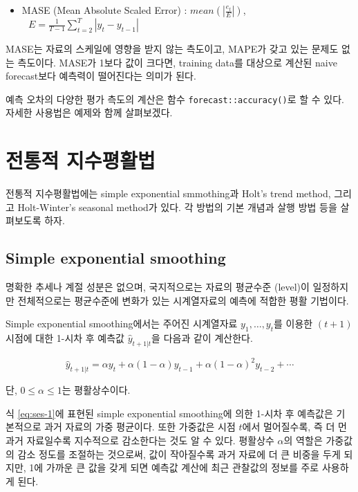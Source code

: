 \documentclass[
]{book}
\providecommand{\tightlist}{%
  \setlength{\itemsep}{0pt}\setlength{\parskip}{0pt}}
\begin{document}
\begin{itemize}
\tightlist
\item
  MASE (Mean Absolute Scaled Error) : \(mean(|\frac{e_{t}}{E}|)\), \(~~~E=\frac{1}{T-1}\sum_{t=2}^{T}|y_{t}-y_{t-1}|\)
\end{itemize}

MASE는 자료의 스케일에 영향을 받지 않는 측도이고, MAPE가 갖고 있는 문제도 없는 측도이다. MASE가 1보다 값이 크다면, training data를 대상으로 계산된 naive forecast보다 예측력이 떨어진다는 의미가 된다.

예측 오차의 다양한 평가 측도의 계산은 함수 \texttt{forecast::accuracy()}로 할 수 있다. 자세한 사용법은 예제와 함께 살펴보겠다.

\hypertarget{section-exponential}{%
\section{전통적 지수평활법}\label{section-exponential}}

전통적 지수평활법에는 simple exponential smmothing과 Holt's trend method, 그리고 Holt-Winter's seasonal method가 있다. 각 방법의 기본 개념과 살행 방법 등을 살펴보도록 하자.

\hypertarget{simple-exponential-smoothing}{%
\subsection{Simple exponential smoothing}\label{simple-exponential-smoothing}}

명확한 추세나 계절 성분은 없으며, 국지적으로는 자료의 평균수준 (level)이 일정하지만 전체적으로는 평균수준에 변화가 있는 시계열자료의 예측에 적합한 평활 기법이다.

Simple exponential smoothing에서는 주어진 시계열자료 \(y_{1}, \ldots, y_{t}\)를 이용한 \((t+1)\) 시점에 대한 1-시차 후 예측값 \(\hat{y}_{t+1|t}\)을 다음과 같이 계산한다.

\begin{equation}
\hat{y}_{t+1|t} = \alpha y_{t} + \alpha(1-\alpha) y_{t-1} + \alpha(1-\alpha)^{2} y_{t-2} + \cdots
\label{eq:ses-1}
\end{equation}

단, \(0 \leq \alpha \leq 1\)는 평활상수이다.

식 \eqref{eq:ses-1}에 표현된 simple exponential smoothing에 의한 1-시차 후 예측값은 기본적으로 과거 자료의 가중 평균이다. 또한 가중값은 시점 \(t\)에서 멀어질수록, 즉 더 먼 과거 자료일수록 지수적으로 감소한다는 것도 알 수 있다. 평활상수 \(\alpha\)의 역할은 가중값의 감소 정도를 조절하는 것으로써, 값이 작아질수록 과거 자료에 더 큰 비중을 두게 되지만, 1에 가까운 큰 값을 갖게 되면 예측값 계산에 최근 관찰값의 정보를 주로 사용하게 된다.
\end{document}
